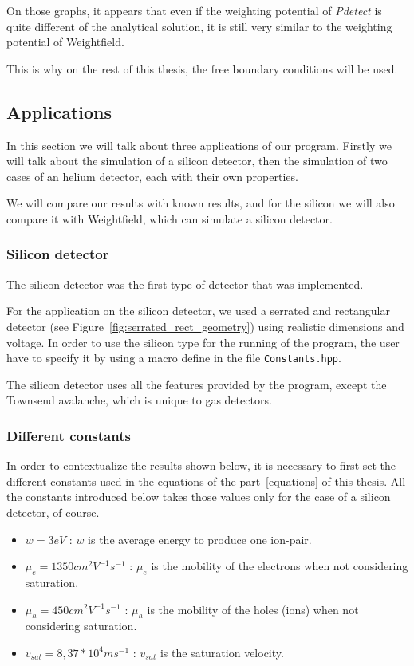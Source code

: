 \documentclass[11pt]{article}
\begin{document}
			On those graphs, it appears that even if the weighting potential of \textit{Pdetect} is quite 
			different of the analytical solution, it is still very similar to the weighting potential 
			of Weightfield.

			This is why on the rest of this thesis, the free boundary conditions will be used.

	\subsection{Applications}

		In this section we will talk about three applications of our program.
		Firstly we will talk about the simulation of a silicon detector, then the
		simulation of two cases of an helium detector, each with their own properties.

		We will compare our results with known results, and for the silicon we will also
		compare it with Weightfield, which can simulate a silicon detector.

		\subsubsection{Silicon detector}

			The silicon detector was the first type of detector that was implemented.

			For the application on the silicon detector, we used a serrated and rectangular detector
			(see Figure~\ref{fig:serrated_rect_geometry}) using realistic dimensions and voltage.
			In order to use the silicon type for the running of the program, the user have to specify
			it by using a macro define in the file \texttt{Constants.hpp}.

			The silicon detector uses all the features provided by the program, except the Townsend
			avalanche, which is unique to gas detectors.

			\subsubsection*{Different constants}

				In order to contextualize the results shown below, it is necessary to first set the
				different constants used in the equations of the part~\ref{equations} of this thesis.
				All the constants introduced below takes those values only for the case of a silicon
				detector, of course.

				\begin{itemize}

					\item $w = 3 eV$ : $w$ is the average energy to produce one ion-pair.
					\item $\mu_e = 1350 cm^2V^{-1}s^{-1}$ : $\mu_e$ is the mobility of the electrons
						when not considering saturation.
					\item $\mu_h = 450 cm^2V^{-1}s^{-1}$ : $\mu_h$ is the mobility of the holes (ions)
						when not considering saturation.
					\item $v_{sat} = 8,37*10^{4} ms^{-1}$ : $v_{sat}$ is the saturation velocity.

				\end{itemize}
\end{document}

